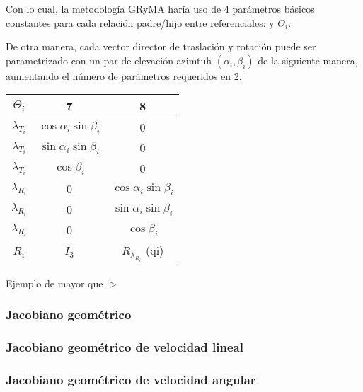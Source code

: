         Con lo cual, la metodología GRyMA haría uso de 4 parámetros básicos constantes 
        para cada relación padre/hijo entre referenciales: %
        y $\Theta_i$.

        De otra manera, cada vector director de traslación y rotación puede ser parametrizado 
        con un par de elevación-azimtuh $(\alpha_i,\beta_i)$ de la siguiente manera, 
        aumentando el número de parámetros requeridos en 2. 

        \begin{table}[H]
            \centering
            \begin{center}
                \begin{tabular}{ccc}
                    $\Theta_i$ & 7 & 8\\
                    \hline \hline 
                    $\lambda_{T_i}$ & $\cos{\alpha_i}\sin{\beta_i}$ & 0\\ 
                    $\lambda_{T_i}$ & $\sin{\alpha_i}\sin{\beta_i}$ & 0\\
                    $\lambda_{T_i}$ & $\cos{\beta_i}$ & 0\\
                    \hline 
                    $\lambda_{R_i}$ & 0 & $\cos{\alpha_i}\sin{\beta_i}$\\
                    $\lambda_{R_i}$ & 0 & $\sin{\alpha_i}\sin{\beta_i}$\\
                    $\lambda_{R_i}$ & 0 & $\cos{\beta_i}$\\
                    \hline 
                    $R_{i}$ & $I_3$ & $R_{\lambda_{R_i}}$ (qi)\\ 
                \end{tabular}
            \end{center}
        \end{table}

        Ejemplo de mayor que $>$

    \subsubsection{Jacobiano geométrico}
    \subsubsection{Jacobiano geométrico de velocidad lineal}
    \subsubsection{Jacobiano geométrico de velocidad angular}


